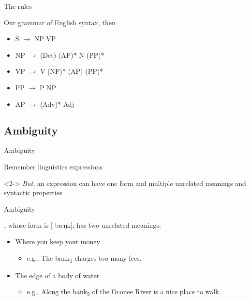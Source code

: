 \documentclass{beamer}
\newcommand{\subonethree}{The rules}
\newcommand{\subonefour}{Ambiguity}
\begin{document}
      \begin{frame}{\subonethree}
        \begin{block}{}
          Our grammar of English syntax, then
        \end{block}
        \begin{block}{}
          \begin{itemize}
            \item S $\rightarrow$ NP VP
            \item NP $\rightarrow$ (Det) (AP)* N (PP)*
            \item VP $\rightarrow$ V (NP)* (AP) (PP)*
            \item PP $\rightarrow$ P NP
            \item AP $\rightarrow$ (Adv)* Adj
          \end{itemize}
        \end{block}
      \end{frame}

    \subsection{\subonefour}
      \begin{frame}{\subonefour}
        \begin{block}{Remember linguistics expressions}
          
        \end{block}
        \begin{alertblock}<2->{}
          \emph{But}, an expression can have one form and multiple unrelated meanings and syntactic properties
        \end{alertblock}
      \end{frame}

      \begin{frame}{\subonefour}
        \begin{example}
          , whose form is [ˈbæŋk], has two unrelated meanings:
          \begin{itemize}
            \item<2-> Where you keep your money
            \begin{itemize}
              \item<2-> e.g., The bank\textsubscript{1} charges too many fees.
            \end{itemize}
            \item<2->  The edge of a body of water
            \begin{itemize}
              \item<2-> e.g., Along the bank\textsubscript{2} of the Oconee River is a nice place to walk.
            \end{itemize}
          \end{itemize}
        \end{example}
      \end{frame}
\end{document}
